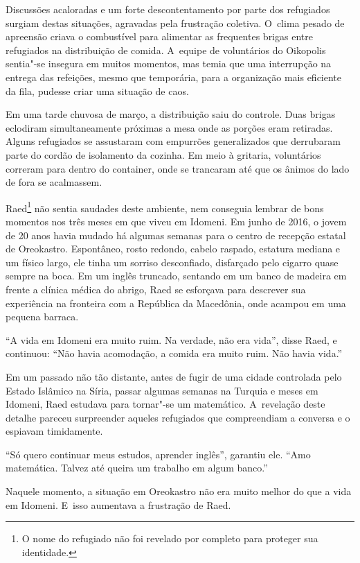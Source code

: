 Discussões acaloradas e um forte descontentamento por parte dos refugiados
surgiam destas situações, agravadas pela frustração coletiva. O~clima pesado de apreensão criava o combustível para
alimentar as frequentes brigas entre refugiados na distribuição de
comida. A~equipe de voluntários do Oikopolis sentia"-se insegura em
muitos momentos, mas temia que uma interrupção na entrega das refeições,
mesmo que temporária, para a organização mais eficiente da fila,
pudesse criar uma situação de caos.

Em uma tarde chuvosa de março, a distribuição saiu do controle. Duas
brigas eclodiram simultaneamente próximas a mesa onde as porções eram
retiradas. Alguns refugiados se assustaram com empurrões generalizados
que derrubaram parte do cordão de isolamento da cozinha. Em meio à
gritaria, voluntários correram para dentro do container, onde se
trancaram até que os ânimos do lado de fora se acalmassem.

Raed\footnote{ O nome do refugiado não foi revelado por completo
para proteger sua identidade.}  não sentia saudades deste ambiente, nem conseguia
lembrar de bons momentos nos três meses em que viveu em Idomeni. Em
junho de 2016, o jovem de 20 anos havia mudado há algumas semanas para o
centro de recepção estatal de Oreokastro. Espontâneo, rosto redondo,
cabelo raspado, estatura mediana e um físico largo, ele tinha um sorriso
desconfiado, disfarçado pelo cigarro quase sempre na boca. Em um inglês
truncado, sentando em um banco de madeira em frente a clínica médica do
abrigo, Raed se esforçava para descrever sua experiência na fronteira
com a República da Macedônia, onde acampou em uma pequena barraca.

``A vida em Idomeni era muito ruim. Na verdade, não era vida'', disse
Raed, e continuou: ``Não havia acomodação, a comida era muito ruim. Não havia vida.''

Em um passado não tão distante, antes de fugir de uma cidade controlada
pelo Estado Islâmico na Síria, passar algumas semanas na Turquia e meses
em Idomeni, Raed estudava para tornar"-se um matemático. A~revelação
deste detalhe pareceu surpreender aqueles refugiados que compreendiam a conversa e o espiavam timidamente.

``Só quero continuar meus estudos, aprender inglês'', garantiu ele.  ``Amo
matemática. Talvez até queira um trabalho em algum banco.''

Naquele momento, a situação em Oreokastro  não era muito melhor do que a vida em Idomeni. E~isso aumentava a frustração de Raed.

